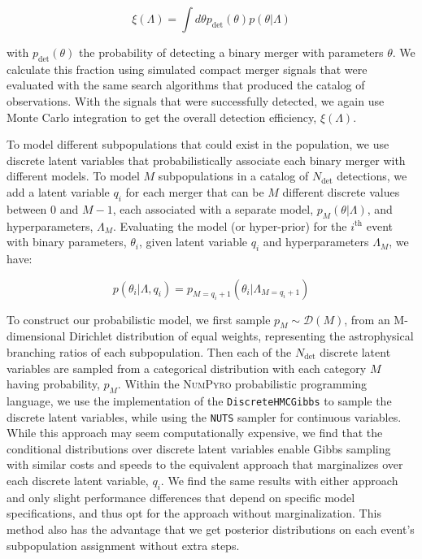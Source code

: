 \begin{equation} \label{eq:detfrac}
    \xi(\Lambda) = \int d\theta p_\mathrm{det}(\theta) p(\theta | \Lambda)
\end{equation}

\noindent with $p_\mathrm{det}(\theta)$ the probability of detecting a binary merger with parameters $\theta$. We calculate this fraction using simulated compact merger signals that were evaluated with the same search algorithms that produced the catalog of observations. With the signals that were successfully detected, we again use Monte Carlo integration to get the overall detection efficiency, $\xi(\Lambda)$.


To model different subpopulations that could exist in the population, we use discrete latent variables that probabilistically associate each binary merger with different models. To model $M$ subpopulations in a catalog of $N_\mathrm{det}$ detections, we add a latent variable $q_i$ for each merger that can be $M$ different discrete values between $0$ and $M-1$, each associated with a separate model, $p_{M}(\theta | \Lambda)$, and hyperparameters, $\Lambda_M$. Evaluating the model (or hyper-prior) for the $i^\mathrm{th}$ event with binary parameters, $\theta_i$, given latent variable $q_i$ and hyperparameters $\Lambda_M$, we have:

\begin{equation} \label{eq:latent}
    p(\theta_i | \Lambda, q_i) = p_{M=q_i+1}(\theta_i | \Lambda_{M=q_i+1})
\end{equation}

\noindent To construct our probabilistic model, we first sample $p_M \sim \mathcal{D}(M)$, from an M-dimensional Dirichlet distribution of equal weights, representing the astrophysical branching ratios of each subpopulation. Then each of the $N_\mathrm{det}$ discrete latent variables are sampled from a categorical distribution with each category $M$ having probability, $p_M$. Within the \textsc{NumPyro} \citep{1810.09538,1912.11554} probabilistic programming language, we use the implementation of the \texttt{DiscreteHMCGibbs} \citep{Liu1996PeskunsTA} to sample the discrete latent variables, while using the \texttt{NUTS} \citep{1111.4246} sampler for continuous variables. While this approach may seem computationally expensive, we find that the conditional distributions over discrete latent variables enable Gibbs sampling with similar costs and speeds to the equivalent approach that marginalizes over each discrete latent variable, $q_i$. We find the same results with either approach and only slight performance differences that depend on specific model specifications, and thus opt for the approach without marginalization. This method also has the advantage that we get posterior distributions on each event's subpopulation assignment without extra steps.

